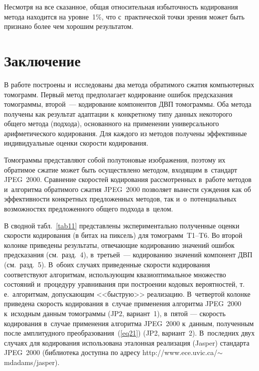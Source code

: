 \begin{multicols}{2}
{}

Несмотря на все сказанное, общая относительная избыточность кодирования метода 
находится на уровне~1\%, что с~практической точки зрения может быть признано 
более чем хорошим результатом.

\vspace*{-6pt}

\section{Заключение}

В работе построены и~исследованы два метода обратимого сжатия компьютерных 
томограмм. Первый метод предполагает кодирование ошибок предсказания томограммы, 
второй~--- кодирование компонентов ДВП томограммы. Оба метода получены как результат 
адаптации к~конкретному типу данных некоторого общего метода (подхода), основанного 
на применении универсального арифметического кодирования. Для каждого из методов 
получены эффективные индивидуальные оценки скорости кодирования.

Томограммы представляют собой полутоновые изображения, поэтому их обратимое 
сжатие может быть осуществлено методом, входящим в~стандарт JPEG~2000. Сравнение 
скоростей кодирования рассмотрен\-ных в~работе методов и~алгоритма обратимого 
сжатия JPEG~2000 позволяет вынести суждения как об эффективности конкретных 
предложенных методов, так и~о~потенциальных возможностях предложенного общего 
подхода в~целом.

В сводной табл.~\ref{tab11} представлены экспериментально полученные оценки 
скорости кодирования (в битах на пиксель) для томограмм~T1--T6. Во второй 
колонке приведены результаты, отвеча\-ющие кодированию значений ошибок предсказания\linebreak 
(см.\ разд.~4), в~третьей~--- кодированию значений компонент ДВП (см.\ разд.~5). 
В~обоих случаях приведенные скорости кодирования соответствуют алгоритмам, 
использующим квазиоптимальное множество состояний и~процедуру уравнивания 
при построении кодовых вероятностей, т.\,е.\ алгоритмам, допускающим <<быструю>> 
реализацию. В~чет\-вер\-той колонке приведена скорость кодирования в~случае применения 
алгоритма JPEG~2000 к~исходным данным томограммы (JP2, вариант~1), в~пятой --- 
скорость кодирования в~случае применения алгоритма JPEG~2000 к~данным, 
полученным после амплитудного преобразования~(\ref{eq21}) (JP2, вариант~2). 
В~последних двух случаях для кодирования использована эталонная реализация (Jasper) 
стандарта JPEG~2000 (библиотека доступна по адресу 
{\sf http://www.ece.uvic.ca/$\sim$mdadams/jasper}).



\end{multicols}
